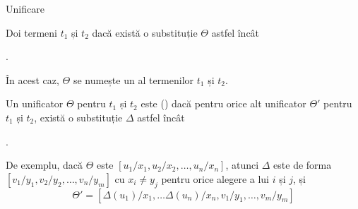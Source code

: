 \documentclass[xcolor=pdftex,romanian,colorlinks]{beamer}
\begin{document}
\begin{frame}{Unificare}

 Doi termeni $t_1$ și $t_2$  dacă există o substituție $\Theta$ astfel încât
 \vspace{-.2cm}
	\begin{center}
	.
	\end{center}
	
În acest caz, $\Theta$ se numește un  al termenilor $t_1$ și $t_2$.
	
	\medskip  
Un unificator $\Theta$ pentru $t_1$ și $t_2$ este  () dacă pentru orice alt unificator $\Theta'$ pentru $t_1$ și $t_2$, există o substituție $\Delta$ astfel încât
 \vspace{-.2cm}
	\begin{center}
	.
	\end{center}

De exemplu, dacă $\Theta$ este  $[u_1 / x_1, u_2 / x_2, \ldots, u_n / x_n]$, atunci
$\Delta$ este de forma $[v_1 / y_1, v_2 / y_2, \ldots, v_n / y_m]$ cu $x_i \neq y_j$ pentru orice
alegere a lui $i$ și $j$, și
$$\Theta' = [\Delta(u_1) / x_1, \ldots \Delta(u_n) / x_n, v_1 / y_1, \ldots, v_m / y_m]$$
\end{frame}
\end{document}
